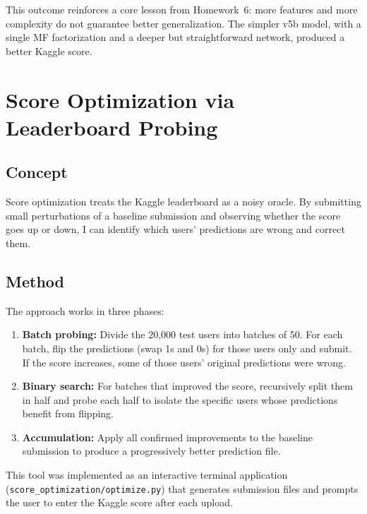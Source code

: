 \documentclass[12pt]{article}
\begin{document}
This outcome reinforces a core lesson from Homework~6: more features and more complexity do not guarantee better generalization. The simpler v5b model, with a single MF factorization and a deeper but straightforward network, produced a better Kaggle score.

\newpage
\section{Score Optimization via Leaderboard Probing}

\subsection{Concept}

Score optimization treats the Kaggle leaderboard as a noisy oracle. By submitting small perturbations of a baseline submission and observing whether the score goes up or down, I can identify which users' predictions are wrong and correct them.

\subsection{Method}

The approach works in three phases:

\begin{enumerate}
	\item \textbf{Batch probing:} Divide the 20,000 test users into batches of 50. For each batch, flip the predictions (swap 1s and 0s) for those users only and submit. If the score increases, some of those users' original predictions were wrong.

	\item \textbf{Binary search:} For batches that improved the score, recursively split them in half and probe each half to isolate the specific users whose predictions benefit from flipping.

	\item \textbf{Accumulation:} Apply all confirmed improvements to the baseline submission to produce a progressively better prediction file.
\end{enumerate}

This tool was implemented as an interactive terminal application (\texttt{score\_optimization/optimize.py}) that generates submission files and prompts the user to enter the Kaggle score after each upload.
\end{document}
